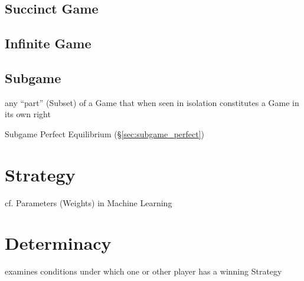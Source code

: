 \subsection{Succinct Game}\label{sec:succinct_game}

\subsection{Infinite Game}\label{sec:infinite_game}

\subsection{Subgame}\label{sec:subgame}

any ``part'' (Subset) of a Game that when seen in isolation constitutes a Game
in its own right

Subgame Perfect Equilibrium (\S\ref{sec:subgame_perfect})



\section{Strategy}\label{sec:strategy}

cf. Parameters (Weights) in Machine Learning



\section{Determinacy}\label{sec:determinacy}

examines conditions under which one or other player has a winning Strategy



